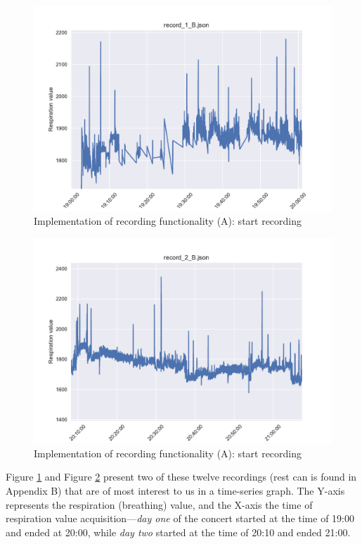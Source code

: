 \begin{figure}[!h]
    \centering
    \includegraphics[scale=0.5]{images/Record_1_B.pdf}
    \caption{Implementation of recording functionality (A): start recording}
    \label{fig:day_1}
\end{figure}

\begin{figure}[!h]
    \centering
    \includegraphics[scale=0.5]{images/Record_2_B.pdf}
    \caption{Implementation of recording functionality (A): start recording}
    \label{fig:day_2}
\end{figure}



Figure \ref{fig:day_1} and Figure \ref{fig:day_2} present two of these twelve recordings (rest can is found in Appendix B) that are of most interest to us in a time-series graph. The Y-axis represents the respiration (breathing) value, and the X-axis the time of respiration value acquisition---\textit{day one} of the concert started at the time of 19:00 and ended at 20:00, while \textit{day two} started at the time of 20:10 and ended 21:00.

